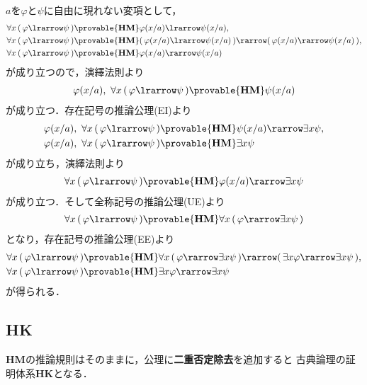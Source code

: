 	\begin{sketch}
		$a$を$\varphi$と$\psi$に自由に現れない変項として，
		\begin{align}
			\forall x\, (\, \varphi \lrarrow \psi\, ) &\provable{\mbox{{\bf HM}}}
				\varphi(x/a) \lrarrow \psi(x/a), \\
			\forall x\, (\, \varphi \lrarrow \psi\, ) &\provable{\mbox{{\bf HM}}}
				(\, \varphi(x/a) \lrarrow \psi(x/a)\, )
				\rarrow (\, \varphi(x/a) \rarrow \psi(x/a)\, ), \\
			\forall x\, (\, \varphi \lrarrow \psi\, ) &\provable{\mbox{{\bf HM}}}
				\varphi(x/a) \rarrow \psi(x/a)
		\end{align}
		が成り立つので，演繹法則より
		\begin{align}
			\varphi(x/a),\ \forall x\, (\, \varphi \lrarrow \psi\, ) 
				\provable{\mbox{{\bf HM}}} \psi(x/a)
		\end{align}
		が成り立つ．存在記号の推論公理(EI)より
		\begin{align}
			\varphi(x/a),\ \forall x\, (\, \varphi \lrarrow \psi\, ) 
				&\provable{\mbox{{\bf HM}}} \psi(x/a) \rarrow \exists x \psi, \\
			\varphi(x/a),\ \forall x\, (\, \varphi \lrarrow \psi\, ) 
				&\provable{\mbox{{\bf HM}}} \exists x \psi
		\end{align}
		が成り立ち，演繹法則より
		\begin{align}
			\forall x\, (\, \varphi \lrarrow \psi\, ) 
				\provable{\mbox{{\bf HM}}} \varphi(x/a) \rarrow \exists x \psi
		\end{align}
		が成り立つ．そして全称記号の推論公理(UE)より
		\begin{align}
			\forall x\, (\, \varphi \lrarrow \psi\, ) \provable{\mbox{{\bf HM}}} 
				\forall x\, (\, \varphi \rarrow \exists x \psi\, )
		\end{align}
		となり，存在記号の推論公理(EE)より
		\begin{align}
			\forall x\, (\, \varphi \lrarrow \psi\, ) &\provable{\mbox{{\bf HM}}} 
				\forall x\, (\, \varphi \rarrow \exists x \psi\, )
				\rarrow (\, \exists x \varphi \rarrow \exists x \psi\, ), \\
			\forall x\, (\, \varphi \lrarrow \psi\, ) &\provable{\mbox{{\bf HM}}} 
				\exists x \varphi \rarrow \exists x \psi
		\end{align}
		が得られる．
		\QED
	\end{sketch}
	
\subsection{{\bf HK}}
	{\bf HM}の推論規則はそのままに，公理に{\bf 二重否定除去}を追加すると
	古典論理の証明体系{\bf HK}となる．
	
